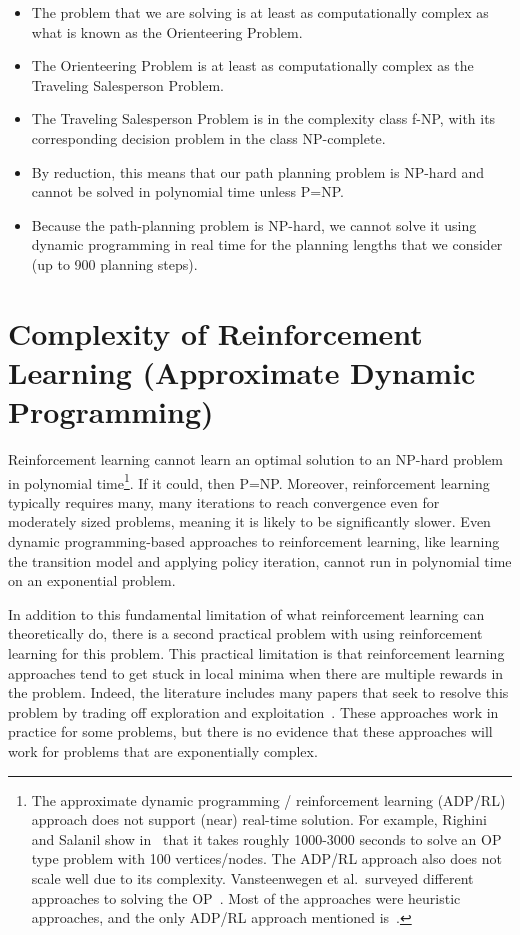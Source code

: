 \begin{itemize}
\item The problem that we are solving is at least as computationally complex as what is known as the Orienteering Problem.  
\item The Orienteering Problem is at least as computationally complex as the Traveling Salesperson Problem.
\item The Traveling Salesperson Problem is in the complexity class f-NP, with its corresponding decision problem in the class NP-complete.
\item By reduction, this means that our path planning problem is NP-hard and cannot be solved in polynomial time unless P=NP.
\item Because the path-planning problem is NP-hard, we cannot solve it using dynamic programming in real time for the planning lengths that we consider (up to 900 planning steps).
\end{itemize}

\section{Complexity of Reinforcement Learning (Approximate Dynamic Programming)}
\label{RLComplexity}

Reinforcement learning cannot learn an optimal solution to an NP-hard problem in polynomial time\footnote{The approximate dynamic programming / reinforcement learning (ADP/RL) approach does not support (near) real-time solution. For example, Righini and Salanil show in~\cite{Righini2009Decremental} that it takes roughly 1000-3000 seconds to solve an OP type problem with 100 vertices/nodes. The ADP/RL approach also does not scale well due to its complexity. Vansteenwegen et al.\ surveyed different approaches to solving the OP~\cite{Vansteenwegen2011Orienteering}. Most of the approaches were heuristic approaches, and the only ADP/RL approach mentioned is~\cite{Righini2009Decremental}.}. If it could, then P=NP. Moreover, reinforcement learning typically requires many, many iterations to reach convergence even for moderately sized problems, meaning it is likely to be significantly slower.  Even dynamic programming-based approaches to reinforcement learning, like learning the transition model and applying policy iteration, cannot run in polynomial time on an exponential problem.

In addition to this fundamental limitation of what reinforcement learning can theoretically do, there is a second practical problem with using reinforcement learning for this problem. This practical limitation is that reinforcement learning approaches tend to get stuck in local minima when there are multiple rewards in the problem.  Indeed, the literature includes many papers that seek to resolve this problem by trading off exploration and exploitation~\cite{Sutton1998Reinforcement}.  These approaches work in practice for some problems, but there is no evidence that these approaches will work for problems that are exponentially complex.  

